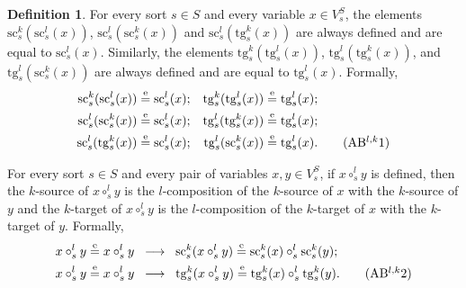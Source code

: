 \documentclass{amsart}
\theoremstyle{plain}
\theoremstyle{definition}
\newtheorem{definition}[theorem]{Definition}
\begin{document}
\begin{definition}
For every sort $s\in S$ and every variable $x\in V^{S}_{s}$, the elements $\mathrm{sc}^{k}_{s}(\mathrm{sc}^{l}_{s}(x))$, $\mathrm{sc}^{l}_{s}(\mathrm{sc}^{k}_{s}(x))$ and $\mathrm{sc}^{l}_{s}(\mathrm{tg}^{k}_{s}(x))$ are always defined and are equal to $\mathrm{sc}^{l}_{s}(x)$. Similarly, the elements $\mathrm{tg}^{k}_{s}(\mathrm{tg}^{l}_{s}(x))$, $\mathrm{tg}^{l}_{s}(\mathrm{tg}^{k}_{s}(x))$, and $\mathrm{tg}^{l}_{s}(\mathrm{sc}^{k}_{s}(x))$ are always defined and are equal to $\mathrm{tg}^{l}_{s}(x)$. Formally,
\allowdisplaybreaks
\begin{align*}
\mathrm{sc}^{k}_{s}(\mathrm{sc}^{l}_{s}(x))&\overset{\mathrm{e}}{=}\mathrm{sc}^{l}_{s}(x);
&
\mathrm{tg}^{k}_{s}(\mathrm{tg}^{l}_{s}(x))&\overset{\mathrm{e}}{=}\mathrm{tg}^{l}_{s}(x);\\
\mathrm{sc}^{l}_{s}(\mathrm{sc}^{k}_{s}(x))&\overset{\mathrm{e}}{=}\mathrm{sc}^{l}_{s}(x);
&
\mathrm{tg}^{l}_{s}(\mathrm{tg}^{k}_{s}(x))&\overset{\mathrm{e}}{=}\mathrm{tg}^{l}_{s}(x);\\
\mathrm{sc}^{l}_{s}(\mathrm{tg}^{k}_{s}(x))&\overset{\mathrm{e}}{=}\mathrm{sc}^{l}_{s}(x);
&
\mathrm{tg}^{l}_{s}(\mathrm{sc}^{k}_{s}(x))&\overset{\mathrm{e}}{=}\mathrm{tg}^{l}_{s}(x).\label{DVarCompactABlk1}\tag{AB$^{l,k}$1}
\end{align*}

For every sort $s\in S$ and every pair of variables $x,y\in V^{S}_{s}$, if $x\circ^{l}_{s}y$ is defined, then the $k$-source of $x\circ^{l}_{s}y$ is the $l$-composition of the $k$-source of $x$ with the $k$-source of $y$ and the $k$-target of $x\circ^{l}_{s}y$ is the $l$-composition of the $k$-target of $x$ with the $k$-target of $y$. Formally,
\allowdisplaybreaks
\begin{align*}
x\circ^{l}_{s}y&\overset{\mathrm{e}}{=}x\circ^{l}_{s}y \;\;\longrightarrow\;\;
\mathrm{sc}^{k}_{s}(x\circ^{l}_{s}y)\overset{\mathrm{e}}{=}\mathrm{sc}^{k}_{s}(x)\circ^{l}_{s}\mathrm{sc}^{k}_{s}(y);\\
x\circ^{l}_{s}y&\overset{\mathrm{e}}{=}x\circ^{l}_{s}y \;\;\longrightarrow\;\;
\mathrm{tg}^{k}_{s}(x\circ^{l}_{s}y)\overset{\mathrm{e}}{=}\mathrm{tg}^{k}_{s}(x)\circ^{l}_{s}\mathrm{tg}^{k}_{s}(y).
\label{DVarCompactABlk2}\tag{AB$^{l,k}$2}
\end{align*}


\end{definition}
\end{document}
